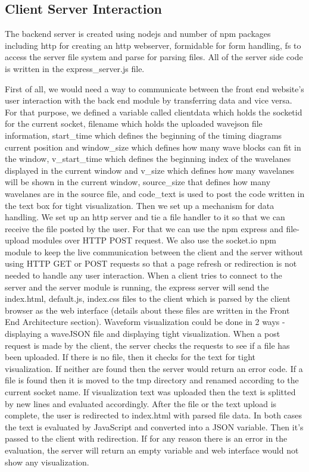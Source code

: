 \documentclass[14pt]{extarticle}
\begin{document}
\subsection{Client Server Interaction}
The backend server is created using nodejs and number of npm packages including http for creating an http webserver, formidable for form handling, fs to access the server file system and parse for parsing files. All of the server side code is written in the express\_server.js file.

 First of all, we would need a way to communicate between the front end website’s user interaction with the back end module by transferring data and vice versa. For that purpose, we defined a variable called clientdata which holds the socketid for the current socket, filename which holds the uploaded wavejson file information, start\_time which defines the beginning of the timing diagrams current position and window\_size which defines how many wave blocks can fit in the window, v\_start\_time which defines the beginning index of the wavelanes displayed in the current window and v\_size which defines how many wavelanes will be shown in the current window, source\_size that defines how many wavelanes are in the source file, and code\_text is used to post the code written in the text box for tight visualization.
 Then we set up a mechanism for data handling. We set up an http server and tie a file handler to it so that we can receive the file posted by the user. For that we can use the npm express and file-upload modules over HTTP POST request. We also use the socket.io npm module to keep the live communication between the client and the server without using HTTP GET or POST requests so that a page refresh or redirection is not needed to handle any user interaction.
 When a client tries to connect to the server and the server module is running, the express server will send the index.html, default.js, index.css files to the client which is parsed by the client browser as the web interface (details about these files are written in the Front End Architecture section). Waveform visualization could be done in 2 ways - displaying a waveJSON file and displaying tight visualization. When a post request is made by the client, the server checks the requests to see if a file has been uploaded. If there is no file, then it checks for the text for tight visualization. If neither are found then the server would return an error code. If a file is found then it is moved to the tmp directory and renamed according to the current socket name. If visualization text was uploaded then  the text is splitted by new lines and evaluated accordingly. After the file or the text upload is complete, the user is redirected to index.html with parsed file data. In both cases the text is evaluated by JavaScript and converted into a JSON variable. Then it’s passed to the client with redirection. If for any reason there is an error in the evaluation, the server will return an empty variable and web interface would not show any visualization.
\end{document}
